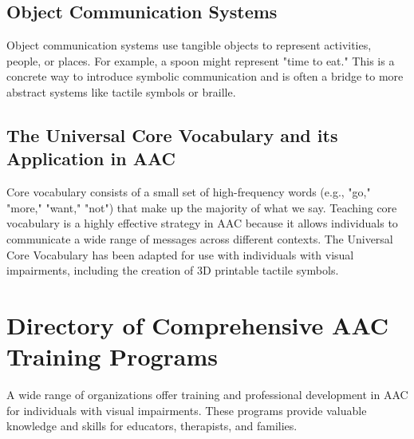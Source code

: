 \subsection{Object Communication Systems}\label{app6:object-comm}
Object communication systems use tangible objects to represent activities, people, or places. For example, a spoon might represent "time to eat." This is a concrete way to introduce symbolic communication and is often a bridge to more abstract systems like tactile symbols or braille.

\subsection{The Universal Core Vocabulary and its Application in AAC}\label{app6:core-vocab}
Core vocabulary consists of a small set of high-frequency words (e.g., "go," "more," "want," "not") that make up the majority of what we say. Teaching core vocabulary is a highly effective strategy in AAC because it allows individuals to communicate a wide range of messages across different contexts. The Universal Core Vocabulary has been adapted for use with individuals with visual impairments, including the creation of 3D printable tactile symbols.

\section{Directory of Comprehensive AAC Training Programs}\label{app6:aac-training}
A wide range of organizations offer training and professional development in AAC for individuals with visual impairments. These programs provide valuable knowledge and skills for educators, therapists, and families.

